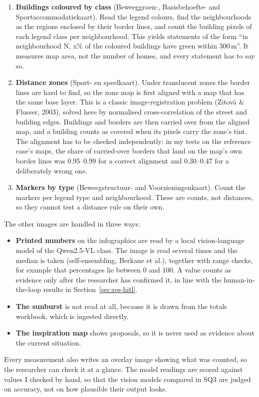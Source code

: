 \begin{enumerate}
\item \textbf{Buildings coloured by class} (Beweeggroen-, Basisbehoefte- and Sportaccommodatiekaart). Read the legend colours, find the neighbourhoods as the regions enclosed by their border lines, and count the building pixels of each legend class per neighbourhood. This yields statements of the form \textquotedblleft{}in neighbourhood N, x\% of the coloured buildings have green within 300\,m\textquotedblright{}. It measures map area, not the number of homes, and every statement has to say so.
\item \textbf{Distance zones} (Sport- en speelkaart). Under translucent zones the border lines are hard to find, so the zone map is first aligned with a map that has the same base layer. This is a classic image-registration problem (Zitov\'a \& Flusser, 2003), solved here by normalised cross-correlation of the street and building edges. Buildings and borders are then carried over from the aligned map, and a building counts as covered when its pixels carry the zone's tint. The alignment has to be checked independently: in my tests on the reference case's maps, the share of carried-over borders that land on the map's own border lines was 0.95--0.99 for a correct alignment and 0.30--0.47 for a deliberately wrong one.
\item \textbf{Markers by type} (Beweegstructuur- and Voorzieningenkaart). Count the markers per legend type and neighbourhood. These are counts, not distances, so they cannot test a distance rule on their own.
\end{enumerate}

The other images are handled in three ways:
\begin{itemize}
\item \textbf{Printed numbers} on the infographics are read by a local vision-language model of the Qwen2.5-VL class. The image is read several times and the median is taken (self-ensembling, Berkane et al.), together with range checks, for example that percentages lie between 0 and 100. A value counts as evidence only after the researcher has confirmed it, in line with the human-in-the-loop results in Section~\ref{sec:res-hitl}.
\item \textbf{The sunburst} is not read at all, because it is drawn from the totals workbook, which is ingested directly.
\item \textbf{The inspiration map} shows proposals, so it is never used as evidence about the current situation.
\end{itemize}
Every measurement also writes an overlay image showing what was counted, so the researcher can check it at a glance. The model readings are scored against values I checked by hand, so that the vision models compared in SQ3 are judged on accuracy, not on how plausible their output looks.
